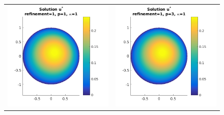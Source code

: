 \documentclass{article}
\begin{document}
\begin{figure}[!ht]
\begin{tabular}{c c}
\includegraphics[scale=0.7]{umustar_121.png} &
\includegraphics[scale=0.7]{umustar_221.png} \\

\end{tabular}
\end{figure}
\end{document}
